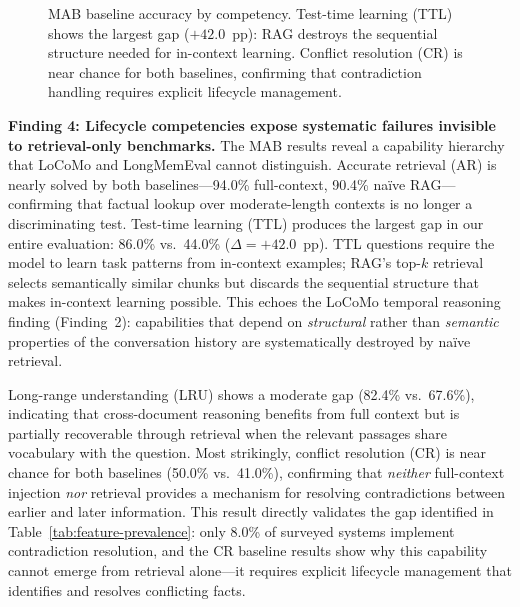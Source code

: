\begin{figure}[!t]
\centering
{}
\caption{MAB baseline accuracy by competency.  Test-time learning (TTL)
shows the largest gap ($+42.0$~pp): RAG destroys the sequential structure
needed for in-context learning.  Conflict resolution (CR) is near chance
for both baselines, confirming that contradiction handling requires
explicit lifecycle management.}
\label{fig:mab-baselines}
\end{figure}

\smallskip
\noindent\textbf{Finding 4: Lifecycle competencies expose systematic
failures invisible to retrieval-only benchmarks.}\enspace
The MAB results reveal a capability hierarchy that LoCoMo and LongMemEval
cannot distinguish.  Accurate retrieval (AR) is nearly solved by both
baselines---94.0\% full-context, 90.4\% na\"ive RAG---confirming that
factual lookup over moderate-length contexts is no longer a discriminating
test.  Test-time learning (TTL) produces the largest gap in our entire
evaluation: 86.0\% vs.\ 44.0\% ($\Delta = +42.0$~pp).  TTL questions
require the model to learn task patterns from in-context examples; RAG's
top-$k$ retrieval selects semantically similar chunks but discards the
sequential structure that makes in-context learning possible.  This echoes
the LoCoMo temporal reasoning finding (Finding~2): capabilities that
depend on \emph{structural} rather than \emph{semantic} properties of the
conversation history are systematically destroyed by na\"ive retrieval.

Long-range understanding (LRU) shows a moderate gap (82.4\% vs.\ 67.6\%),
indicating that cross-document reasoning benefits from full context but is
partially recoverable through retrieval when the relevant passages share
vocabulary with the question.  Most strikingly, conflict resolution (CR)
is near chance for both baselines (50.0\% vs.\ 41.0\%), confirming that
\emph{neither} full-context injection \emph{nor} retrieval provides a
mechanism for resolving contradictions between earlier and later
information.  This result directly validates the gap identified in
Table~\ref{tab:feature-prevalence}: only 8.0\% of surveyed systems
implement contradiction resolution, and the CR baseline results show why
this capability cannot emerge from retrieval alone---it requires explicit
lifecycle management that identifies and resolves conflicting facts.

